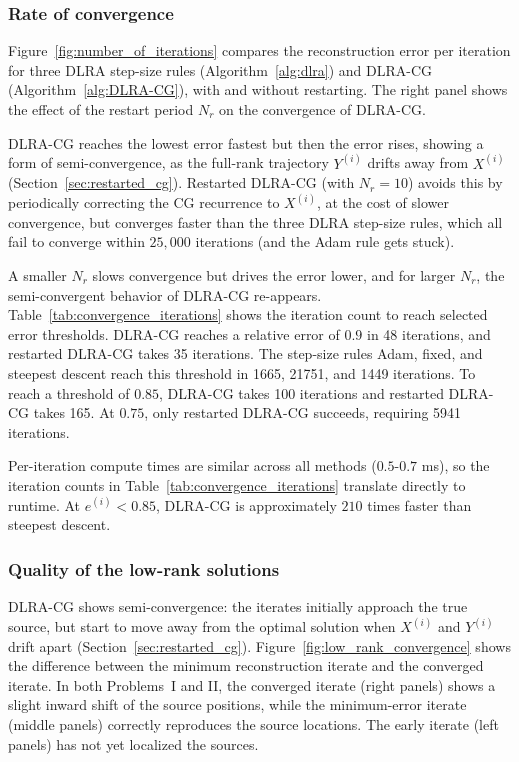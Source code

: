 \subsubsection{Rate of convergence}\label{sec:rate_of_convergence}


Figure~\ref{fig:number_of_iterations} compares the reconstruction error per iteration for three DLRA step-size rules (Algorithm~\ref{alg:dlra}) and DLRA-CG (Algorithm~\ref{alg:DLRA-CG}), with and without restarting. The right panel shows the effect of the restart period $N_r$ on the convergence of DLRA-CG.

DLRA-CG reaches the lowest error fastest but then the error rises, showing a form of semi-convergence, as the full-rank trajectory $Y^{(i)}$ drifts away from $X^{(i)}$ (Section~\ref{sec:restarted_cg}). Restarted DLRA-CG (with $N_r = 10$) avoids this by periodically correcting the CG recurrence to $X^{(i)}$, at the cost of slower convergence, but converges faster than the three DLRA step-size rules, which all fail to converge within $25{,}000$ iterations (and the Adam
rule gets stuck).

A smaller $N_r$ slows convergence but drives the error lower, and for larger $N_r$, the semi-convergent behavior of DLRA-CG re-appears. Table~\ref{tab:convergence_iterations} shows the iteration count to reach selected error thresholds. DLRA-CG reaches a relative error of $0.9$ in 48 iterations, and restarted DLRA-CG takes 35 iterations. The step-size rules Adam, fixed, and steepest descent reach this threshold in 1665, 21751, and 1449 iterations. To reach a threshold of $0.85$, DLRA-CG takes 100 iterations and restarted DLRA-CG takes 165. At $0.75$, only restarted DLRA-CG succeeds, requiring 5941 iterations.

Per-iteration compute times are similar across all methods ($0.5$-$0.7$ ms), so the iteration counts in Table~\ref{tab:convergence_iterations} translate directly to runtime. At $e^{(i)} < 0.85$, DLRA-CG is approximately $210$ times faster than steepest descent.


\subsubsection{Quality of the low-rank solutions}\label{sec:quality_of_the_low_rank_solutions}


DLRA-CG shows semi-convergence: the iterates initially approach the true source, but start to move away from the optimal solution when $X^{(i)}$ and $Y^{(i)}$ drift apart (Section~\ref{sec:restarted_cg}). Figure~\ref{fig:low_rank_convergence} shows the difference between the minimum reconstruction iterate and the converged iterate. In both Problems~I and II, the converged iterate (right panels) shows a slight inward shift of the source positions, while the minimum-error iterate (middle panels) correctly reproduces the source locations. The early iterate (left panels) has not yet localized the sources.

